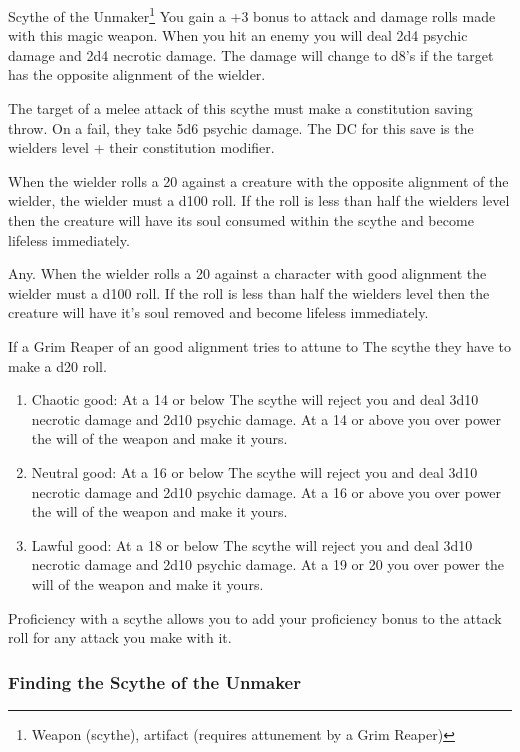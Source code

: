 \begin{commentbox}{Scythe of the Unmaker\footnote{Weapon (scythe), artifact (requires attunement by a Grim Reaper)}}
	You gain a +3 bonus to attack and damage rolls made with this magic weapon. When you hit an enemy you will deal 2d4 psychic damage and 2d4 necrotic damage. The damage will change to d8's if the target has the opposite alignment of the wielder.
	
	The target of a melee attack of this scythe must make a constitution saving throw. On a fail, they take 5d6 psychic damage. The DC for this save is the wielders level + their constitution modifier.
	
	When the wielder rolls a 20 against a creature with the opposite alignment of the wielder, the wielder must a d100 roll. If the roll is less than half the wielders level then the creature will have its soul consumed within the scythe and become lifeless immediately.
	
	Any. When the wielder rolls a 20 against a character with good alignment the wielder must a d100 roll. If the roll is less than half the wielders level then the creature will have it's soul removed and become lifeless immediately.
	
	If a Grim Reaper of an good alignment tries to attune to The scythe they have to make a d20 roll. 
	\begin{enumerate}
		\item Chaotic good: At a 14 or below The scythe will reject you and deal 3d10 necrotic damage and 2d10 psychic damage. At a 14 or above you over power the will of the weapon and make it yours.
		\item Neutral good: At a 16 or below The scythe will reject you and deal 3d10 necrotic damage and 2d10 psychic damage. At a 16 or above you over power the will of the weapon and make it yours.
		\item Lawful good: At a 18 or below The scythe will reject you and deal 3d10 necrotic damage and 2d10 psychic damage. At a 19 or 20 you over power the will of the weapon and make it yours.
	\end{enumerate}
	
	Proficiency with a scythe allows you to add your proficiency bonus to the attack roll for any attack you make with it.
\end{commentbox}

\subsubsection{Finding the Scythe of the Unmaker}

